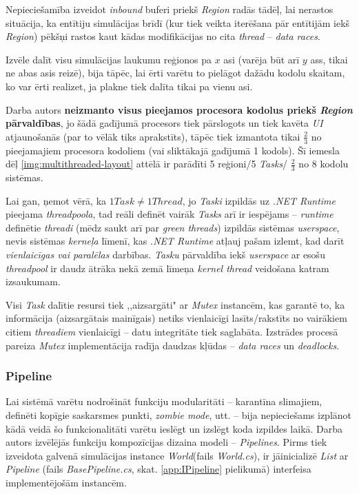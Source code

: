 Nepieciešamība izveidot \emph{inbound} buferi priekš \emph{Region} radās tādēļ, lai
nerastos situācija,
ka entītiju simulācijas brīdī (kur tiek veikta iterēšana pār entītijām iekš \emph{Region}) pēkšņi
rastos kaut kādas modifikācijas no cita \emph{thread} -- \emph{data races}.

Izvēle dalīt visu simulācijas laukumu reģionos pa \(x\) asi (varēja būt arī \(y\)
ass, tikai ne abas asis reizē), bija tāpēc, lai ērti varētu to pielāgot dažādu
kodolu skaitam, ko var ērti realizet, ja plakne tiek dalīta tikai pa vienu asi.

Darba autors \textbf{neizmanto visus pieejamos procesora kodolus priekš \emph{Region} pārvaldības}, jo šādā gadījumā
procesors tiek pārslogots un tiek kavēta \emph{UI} atjaunošanās (par to
vēlāk tiks aprakstīts), tāpēc tiek izmantota tikai \(\frac{2}{3}\) no
pieejamajiem procesora kodoliem (vai sliktākajā gadījumā 1 kodols). Šī iemesla dēļ
\ref{img:multithreaded-layout} attēlā ir parādīti 5 reģioni/5 \emph{Tasks}/ \(\frac{2}{3}\) no 8 kodolu sistēmas.

Lai gan, ņemot vērā, ka \(1 Task\neq 1 Thread\), jo \emph{Taski} izpildās uz \emph{.NET Runtime}
pieejama \emph{threadpoola}\cite{csharp:tasks-not-threads}, tad reāli definēt vairāk
\emph{Tasks} arī ir iespējams -- \emph{runtime} definētie \emph{threadi} (mēdz saukt arī par
\emph{green threads}\cite{progr:green-threads}) izpildās
sistēmas \emph{userspace}\cite{sys:userspace}, nevis sistēmas \emph{kerneļa} līmenī, kas \emph{.NET Runtime}
atļauj pašam izlemt, kad darīt \emph{vienlaicīgas vai paralēlas}\cite{csharp:concurrent-parallel} darbības.
\emph{Tasku} pārvaldība iekš
\emph{userspace} ar esošu \emph{threadpool} ir daudz ātrāka nekā zemā līmeņa \emph{kernel thread} veidošana
katram izsaukumam.

Visi \emph{Task} dalītie resursi tiek ,,aizsargāti" ar \emph{Mutex}\cite{csharp:mutex}
instancēm, kas garantē to, ka informācija (aizsargātais mainīgais) netiks vienlaicīgi lasīts/rakstīts no
vairākiem citiem \emph{threadiem} vienlaicīgi -- datu integritāte tiek saglabāta. Izstrādes procesā
pareiza \emph{Mutex} implementācija radīja daudzas kļūdas -- \emph{data races} un \emph{deadlocks}.

\subsubsection*{Pipeline}

Lai sistēmā varētu nodrošināt funkciju modularitāti -- karantīna slimajiem,
definēti kopīgie saskarsmes punkti, \emph{zombie mode}, utt. -- bija nepieciešams
izplānot kādā veidā šo funkcionalitāti varētu ieslēgt un izslēgt koda izpildes
laikā. Darba autors izvēlējās funkciju kompozīcijas dizaina modeli --
\emph{Pipelines}\cite{progr:pipelines}. Pirms tiek izveidota galvenā simulācijas
instance \emph{World}(fails \emph{World.cs}), ir jāinicializē \emph{List} ar
\emph{Pipeline} (fails \emph{BasePipeline.cs}, skat. \ref{app:IPipeline} pielikumā)
interfeisa implementējošām instancēm.

